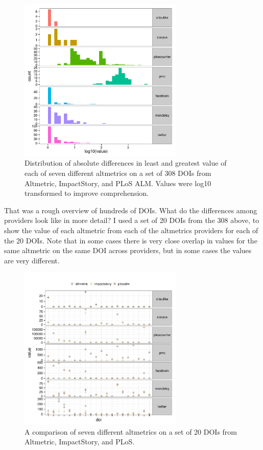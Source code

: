 \documentclass[letterpaper,superscriptaddress,showkeys,longbibliography]{revtex4-1}\usepackage{graphicx, color}
\begin{document}
\begin{figure}[!ht]
  \centering
  \includegraphics[width=0.7\textwidth]{figure/dataconst_plot.pdf}
  \caption{Distribution of absolute differences in least and greatest value of each of seven different altmetrics on a set of 308 DOIs from Altmetric, ImpactStory, and PLoS ALM. Values were log10 transformed to improve comprehension.} %
\end{figure}





That was a rough overview of hundreds of DOIs. What do the differences among providers look like in more detail? I used a set of 20 DOIs from the 308 above, to show the value of each altmetric from each of the altmetrics providers for each of the 20 DOIs. Note that in some cases there is very close overlap in values for the same altmetric on the same DOI across providers, but in some cases the values are very different. 




\begin{figure}[!ht]
  \centering
  \includegraphics[width=0.7\textwidth]{figure/dataconst2.pdf}
  \caption{A comparison of seven different altmetrics on a set of 20 DOIs from Altmetric, ImpactStory, and PLoS.} %
\end{figure}
\end{document}
